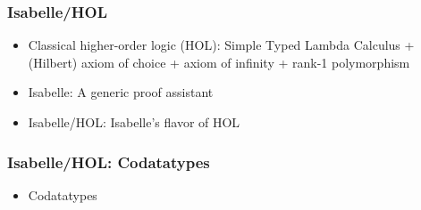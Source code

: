 \documentclass[aspectratio=169,10pt]{beamer}
\begin{document}
\begin{frame}[fragile]
  \frametitle{Isabelle/HOL}
  \begin{itemize}
    \item Classical higher-order logic (HOL): Simple Typed Lambda Calculus + (Hilbert) axiom of choice + axiom of infinity + rank-1 polymorphism
          \pause
    \item Isabelle: A generic proof assistant
          \begin{overlayarea}{\textwidth}{.45\textheight}
            \centering
            \begin{figure}
              \centering
            \end{figure}
          \end{overlayarea}
    \item Isabelle/HOL: Isabelle's flavor of HOL
  \end{itemize}
\end{frame}

\begin{frame}[fragile]
  \frametitle{Isabelle/HOL: Codatatypes}
  \begin{itemize}
    \item Codatatypes
          \vspace*{-1ex}
  \end{itemize}
\end{frame}
\end{document}
